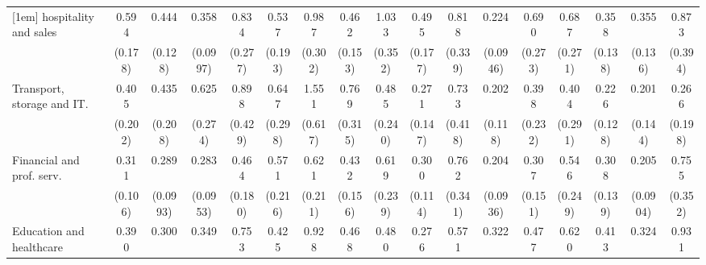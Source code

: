{\begin{tabular}{l*{16}{c}}
[1em]
hospitality and sales&       0.594         &       0.444\sym{**} &       0.358\sym{***}&       0.834         &       0.537         &       0.987         &       0.462\sym{*}  &       1.033         &       0.495\sym{*}  &       0.818         &       0.224\sym{***}&       0.690         &       0.687         &       0.358\sym{**} &       0.355\sym{**} &       0.873         \\
                    &     (0.178)         &     (0.128)         &    (0.0997)         &     (0.277)         &     (0.193)         &     (0.302)         &     (0.153)         &     (0.352)         &     (0.177)         &     (0.339)         &    (0.0946)         &     (0.273)         &     (0.271)         &     (0.138)         &     (0.136)         &     (0.394)         \\
[1em]
Transport, storage and IT.&       0.405         &       0.435         &       0.625         &       0.898         &       0.647         &       1.551         &       0.769         &       0.485         &       0.271\sym{*}  &       0.733         &       0.202\sym{**} &       0.398         &       0.404         &       0.226\sym{**} &       0.201\sym{*}  &       0.266         \\
                    &     (0.202)         &     (0.208)         &     (0.274)         &     (0.429)         &     (0.298)         &     (0.617)         &     (0.315)         &     (0.240)         &     (0.147)         &     (0.418)         &     (0.118)         &     (0.232)         &     (0.291)         &     (0.128)         &     (0.144)         &     (0.198)         \\
[1em]
Financial and prof. serv.&       0.311\sym{***}&       0.289\sym{***}&       0.283\sym{***}&       0.464\sym{*}  &       0.571         &       0.621         &       0.432\sym{*}  &       0.619         &       0.300\sym{**} &       0.762         &       0.204\sym{***}&       0.307\sym{*}  &       0.546         &       0.308\sym{**} &       0.205\sym{***}&       0.755         \\
                    &     (0.106)         &    (0.0993)         &    (0.0953)         &     (0.180)         &     (0.216)         &     (0.211)         &     (0.156)         &     (0.239)         &     (0.114)         &     (0.341)         &    (0.0936)         &     (0.151)         &     (0.249)         &     (0.139)         &    (0.0904)         &     (0.352)         \\
[1em]
Education and healthcare&       0.390\sym{**} &       0.300\sym{***}&       0.349\sym{**} &       0.753         &       0.425\sym{*}  &       0.928         &       0.468\sym{*}  &       0.480         &       0.276\sym{***}&       0.571         &       0.322\sym{**} &       0.477         &       0.620         &       0.413\sym{*}  &       0.324\sym{**} &       0.931         \\

\end{tabular}}
